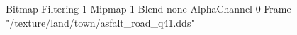 {Bitmap
	{Filtering 1}
	{Mipmap 1}
	{Blend none}
	{AlphaChannel 0}
	{Frame "/texture/land/town/asfalt_road_q41.dds"}
}
